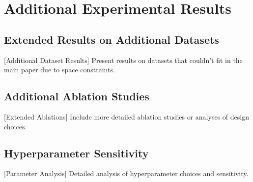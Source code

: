 \section{Additional Experimental Results}
\label{app:additional-results}

\subsection{Extended Results on Additional Datasets}
\label{app:extended-results}

[Additional Dataset Results] Present results on datasets that couldn't fit in the main paper due to space constraints.


\subsection{Additional Ablation Studies}
\label{app:additional-ablations}

[Extended Ablations] Include more detailed ablation studies or analyses of design choices.

\subsection{Hyperparameter Sensitivity}
\label{app:hyperparameters}

[Parameter Analysis] Detailed analysis of hyperparameter choices and sensitivity.

